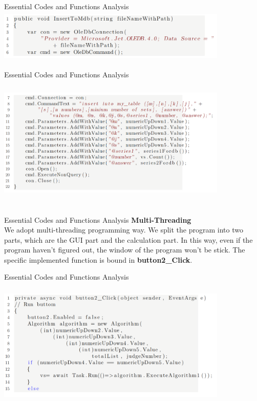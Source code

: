 \documentclass[hyperref={pdfpagelabels=false}]{beamer}
\begin{document}
\begin{frame}{Essential Codes and Functions Analysis}
    \includegraphics[width=11cm,height=2.5cm]{Figures/6.PNG}
\end{frame}

\begin{frame}{Essential Codes and Functions Analysis}
    \includegraphics[width=11cm,height=6.5cm]{Figures/7.PNG}
\end{frame}

\begin{frame}{Essential Codes and Functions Analysis}
    \textbf{Multi-Threading}\\
    We adopt multi-threading programming way. We split the program into two parts, which are the GUI part and the calculation part. In this way, even if the program haven't figured out, the window of the program won't be stick. The specific implemented function is bound in \textbf{button2\_Click}.
\end{frame}

\begin{frame}{Essential Codes and Functions Analysis}
    \includegraphics[width=11cm,height=6.5cm]{Figures/8.PNG}
\end{frame}
\end{document}
